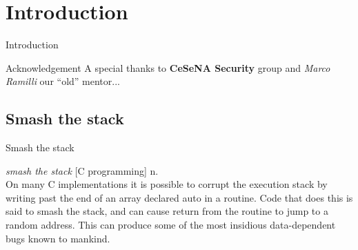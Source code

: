 \section{Introduction}
\begin{frame}{Introduction}
\begin{block}{Acknowledgement}
A special thanks to {\bf CeSeNA Security} group and \emph{Marco Ramilli} our ``old'' mentor...
\end{block}
\end{frame}

\subsection{Smash the stack}
\begin{frame}{Smash the stack}
\begin{block}{}
\emph{smash the stack} [C programming] n.\\
On many C implementations it is possible to corrupt the execution stack by writing past the end of an array declared auto in a routine.  Code that does this is said to smash the stack, and can cause return from the routine to jump to a random address. This can produce some of the most insidious data-dependent bugs known to mankind.
\end{block}
\end{frame}
